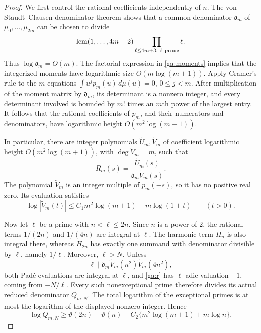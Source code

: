 \documentclass[11pt,a4paper]{article}
\numberwithin{equation}{section}
\theoremstyle{definition}
\theoremstyle{remark}
\begin{document}
\begin{proof}
We first control the rational coefficients independently of $n$.
The von Staudt--Clausen denominator theorem shows that a common
denominator $\mathfrak d_m$ of $\mu_0,\ldots,\mu_{2m}$ can be chosen
to divide
\[
 \operatorname{lcm}(1,\ldots,4m+2)
       \prod_{\ell\le4m+3,\ \ell\ {\rm prime}}\ell.
\]
Thus $\log\mathfrak d_m=O(m)$.  The factorial expression in
\eqref{ga:moments} implies that the integerized moments have
logarithmic size $O(m\log(m+1))$.
Apply Cramer's rule to the $m$ equations
$\int u^jp_m(u)\,d\mu(u)=0$, $0\le j<m$.
After multiplication of the moment matrix by $\mathfrak d_m$,
its determinant is a nonzero integer, and every determinant involved
is bounded by $m!$ times an $m$th power of the largest entry.
It follows that the rational coefficients of $p_m$, and their
numerators and denominators, have logarithmic height
$O(m^2\log(m+1))$.

In particular, there are integer polynomials
$\widetilde U_m,\widetilde V_m$ of coefficient logarithmic height
$O(m^2\log(m+1))$, with $\deg\widetilde V_m=m$, such that
\[
 R_m(s)=\frac{\widetilde U_m(s)}
                {\mathfrak d_m\widetilde V_m(s)}.
\]
The polynomial $\widetilde V_m$ is an integer multiple of
$p_m(-s)$, so it has no positive real zero.  Its evaluation satisfies
\[
 \log|\widetilde V_m(t)|
 \le C_1m^2\log(m+1)+m\log(1+t)\qquad(t>0).
\]

Now let $\ell$ be a prime with $n<\ell\le2n$.
Since $n$ is a power of $2$, the rational terms $1/(2n)$ and $1/(4n)$
are integral at $\ell$.  The harmonic term $H_n$ is also integral
there, whereas $H_{2n}$ has exactly one summand with denominator
divisible by $\ell$, namely $1/\ell$.  Moreover, $\ell>N$.
Unless
\[
 \ell\mid
 \mathfrak d_m\widetilde V_m(n^2)\widetilde V_m(4n^2),
\]
both Pad\'e evaluations are integral at $\ell$, and \eqref{ga:r}
has $\ell$-adic valuation $-1$, coming from $-N/\ell$.
Every such nonexceptional prime therefore divides its actual
reduced denominator $Q_{m,N}$.  The total logarithm of the
exceptional primes is at most the logarithm of the displayed
nonzero integer.  Hence
\begin{equation}\label{ga:denominator-lower}
 \log Q_{m,N}\ge\vartheta(2n)-\vartheta(n)
 -C_2\{m^2\log(m+1)+m\log n\}.
\end{equation}


\end{proof}
\end{document}
